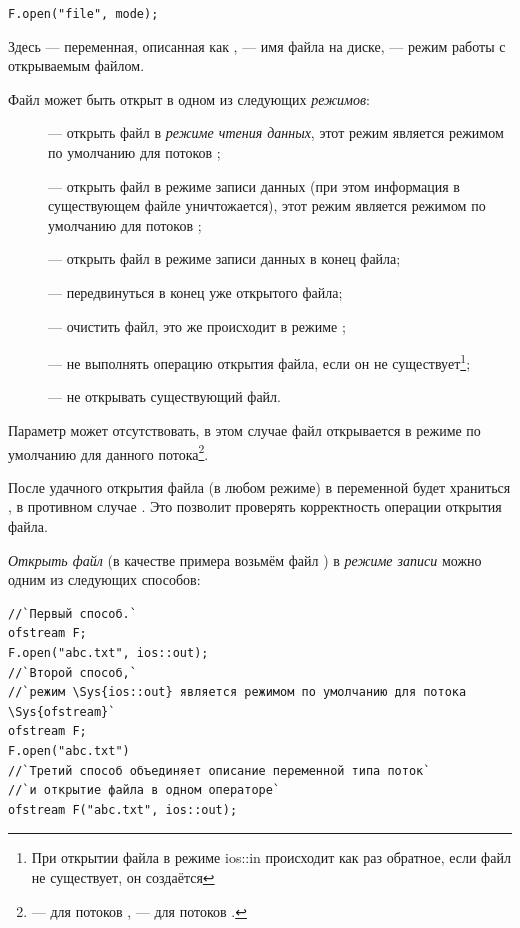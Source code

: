 \lstinline!F.open("file", mode);!

Здесь  --- переменная, описанная как ,  --- имя файла
на диске,  --- режим работы с открываемым файлом. 

Файл может быть открыт в одном из следующих \emph{режимов}:
\begin{description}
\item[] --- открыть файл в \emph{режиме чтения данных}, этот режим является режимом по
умолчанию для потоков ;
\item[] --- открыть файл в режиме записи данных (при этом информация в существующем файле
уничтожается), этот режим является режимом по умолчанию для потоков ;
\item[] --- открыть файл в режиме записи данных в конец файла;
\item[] --- передвинуться в конец уже открытого файла;
\item[] --- очистить файл, это же происходит в режиме ;
\item[] --- не выполнять операцию открытия файла, если он не существует\footnote{При открытии
файла в режиме ios::in происходит как раз обратное, если файл не существует, он создаётся}; 
\item[] --- не открывать существующий файл.
\end{description}
Параметр  может отсутствовать, в этом случае файл открывается в режиме по умолчанию для данного
потока\footnote{ --- для потоков ,  --- для потоков .}.

После удачного открытия файла (в любом режиме) в переменной  будет храниться
, в противном случае . Это позволит проверять корректность операции
открытия файла.

\emph{Открыть файл} (в качестве примера возьмём файл ) в \emph{режиме
записи} можно одним из следующих способов:
\begin{lstlisting}
//`Первый способ.`
ofstream F;			
F.open("abc.txt", ios::out);
//`Второй способ,` 
//`режим \Sys{ios::out} является режимом по умолчанию для потока \Sys{ofstream}`
ofstream F; 
F.open("abc.txt")
//`Третий способ объединяет описание переменной типа поток` 
//`и открытие файла в одном операторе`
ofstream F("abc.txt", ios::out);
\end{lstlisting}


